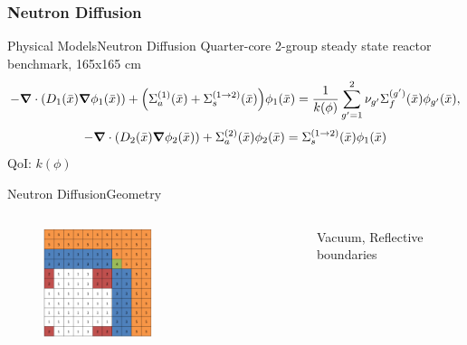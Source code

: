 \documentclass{beamer}
\newcommand{\xs}[2]{\ensuremath{\Sigma_{#1}^{(#2)}}}
\begin{document}
\subsubsection{Neutron Diffusion}
\begin{frame}{Physical Models}{Neutron Diffusion}%
  Quarter-core 2-group steady state reactor benchmark, 165x165 cm 
  \footnotesize
  \begin{equation*}
    -\grad\cdot\qty( D_1(\bar x)\grad\phi_1(\bar x))+\qty(\xs{a}{1}(\bar x)+\xs{s}{1\to2}(\bar x))\phi_1(\bar x)
    = \frac{1}{k(\phi)}\sum_{g'=1}^2\nu_{g'}\xs{f}{g'}(\bar x)\phi_{g'}(\bar x),
  \end{equation*}
  \begin{equation*}
    -\grad \cdot\qty(D_2(\bar x)\grad \phi_2(\bar x))+\xs{a}{2}(\bar x)\phi_2(\bar x) = \xs{s}{1\to 2}(\bar
    x)\phi_1(\bar x)
  \end{equation*}
  QoI: $k(\phi)$
\end{frame}

\begin{frame}{Neutron Diffusion}{Geometry}%
  \begin{columns}
  \begin{column}{0.5\textwidth}
    \begin{figure}[h!]
      \centering
      \includegraphics[width=0.5\textwidth]{../../graphics/core}
    \end{figure}
  \end{column}
  \begin{column}{0.5\textwidth}
    Vacuum, Reflective boundaries
  \end{column}
  \end{columns}
\end{frame}
\end{document}
